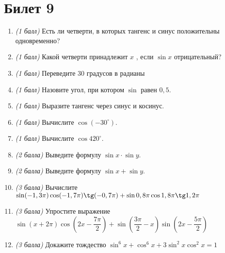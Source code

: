 \documentclass[12pt, a4paper]{article}
\begin{document}
\section*{Билет 9}
\begin{enumerate}
	\item \textit{(1 балл)}	Есть ли четверти, в которых тангенс и синус положительны одновременно? 
	\item \textit{(1 балл)}	Какой четверти принадлежит $x$ , если $\sin x$ отрицательный?
	\item \textit{(1 балл)}	Переведите 30 градусов в радианы
	\item \textit{(1 балл)}	Назовите угол, при котором $\sin$  равен $0,5$.
	\item \textit{(1 балл)}	Выразите тангенс через синус и косинус.
	\item \textit{(1 балл)} Вычислите $\cos (-30^{\circ})$.
	\item \textit{(1 балл)}	Вычислите $\cos 420^{\circ}$.
	\item \textit{(2 балла)} Выведите формулу $\sin x \cdot \sin y$.
	\item \textit{(2 балла)} Выведите формулу $\sin x + \sin y$.
	\item \textit{(3 балла)} Вычислите $\sin (-1,3\pi) \cos (-1,7 \pi) \tg (-0,7\pi)+ \sin 0,8\pi \cos 1,8 \pi \tg 1,2 \pi$
	\item \textit{(3 балла)} Упростите выражение $\sin (x+2\pi) \cos (2x-\dfrac{7\pi}{2})+ \sin (\dfrac{3\pi}{2}-x) \sin (2x - \dfrac{5\pi}{2})$
	\item \textit{(3 балла)} Докажите тождество $\sin^6x + \cos^6x + 3\sin^2x\cos^2x = 1$
\end{enumerate}
\end{document}
